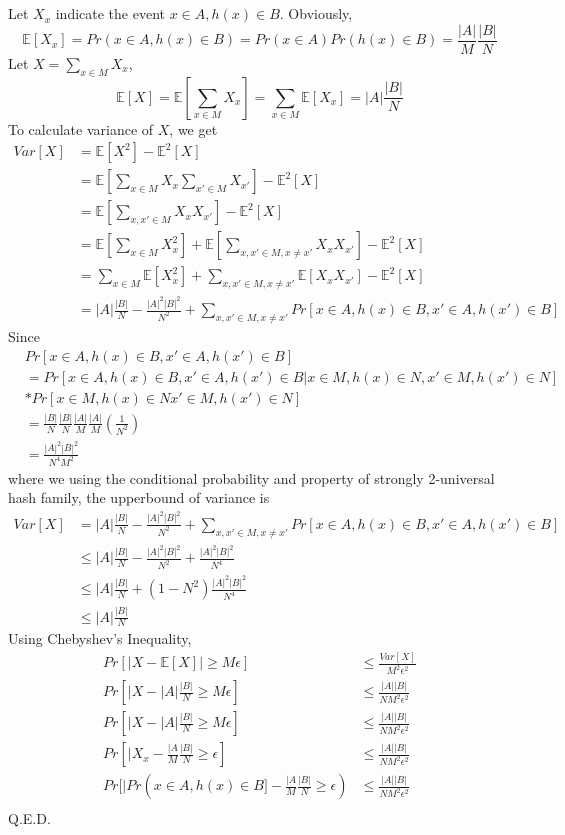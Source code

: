 \documentclass{article}
\begin{document}
	\section{}
	Let $X_x$ indicate the event ${x \in A, h(x) \in B}$.
	Obviously,
	$$
	\mathbb{E}[X_x]=Pr(x \in A, h(x) \in B) = Pr(x \in A)Pr(h(x) \in B) = \frac{|A|}{M}\frac{|B|}{N}
	$$
	Let $X=\sum_{x\in M}X_x$,
	$$
	\mathbb{E}[X]=\mathbb{E}[\sum_{x \in M}X_x]=\sum_{x \in M}\mathbb{E}[X_x]=|A|\frac{|B|}{N}
	$$
	To calculate variance of $X$, we get
	$$
	\begin{aligned}
	Var[X]&=\mathbb{E}[X^2]-\mathbb{E}^2[X]\\
		&=\mathbb{E}[\sum_{x \in M}X_x\sum_{x' \in M}X_{x'}]-\mathbb{E}^2[X]\\	
		&=\mathbb{E}[\sum_{x,x' \in M}X_xX_{x'}]-\mathbb{E}^2[X]\\
		&=\mathbb{E}[\sum_{x \in M}X_x^2]+\mathbb{E}[\sum_{x,x' \in M,x \neq x'}X_xX_{x'}]-\mathbb{E}^2[X]\\
		&=\sum_{x \in M}\mathbb{E}[X_x^2]+\sum_{x,x' \in M,x \neq x'}\mathbb{E}[X_xX_{x'}]-\mathbb{E}^2[X]\\
		&=|A|\frac{|B|}{N}-\frac{|A|^2|B|^2}{N^2}+\sum_{x,x' \in M,x \neq x'}Pr[x \in A, h(x) \in B, x' \in A, h(x') \in B]
	\end{aligned}
	$$
	Since
	$$
	\begin{aligned}
	&Pr[x \in A, h(x) \in B, x' \in A, h(x') \in B]\\
	&=Pr[x \in A, h(x) \in B, x' \in A, h(x') \in B|x \in M, h(x) \in N, x' \in M, h(x') \in N]\\
	&*Pr[x \in M, h(x) \in N x' \in M, h(x') \in N]\\
	&=\frac{|B|}{N}\frac{|B|}{N}\frac{|A|}{M}\frac{|A|}{M}(\frac{1}{N^2})\\
	&=\frac{|A|^2|B|^2}{N^4M^2}
	\end{aligned}
	$$
	where we using the conditional probability and property of strongly 2-universal hash family, the upperbound of variance is
	$$
	\begin{aligned}
	Var[X] &= |A|\frac{|B|}{N}-\frac{|A|^2|B|^2}{N^2}+\sum_{x,x' \in M,x \neq x'}Pr[x \in A, h(x) \in B, x' \in A, h(x') \in B]\\
	&\leq |A|\frac{|B|}{N}-\frac{|A|^2|B|^2}{N^2}+\frac{|A|^2|B|^2}{N^4}\\
	&\leq |A|\frac{|B|}{N}+(1-N^2)\frac{|A|^2|B|^2}{N^4}\\
	&\leq |A|\frac{|B|}{N}
	\end{aligned}
	$$
	Using Chebyshev's Inequality,
	$$
	\begin{aligned}
	Pr[|X-\mathbb{E}[X]| \geq M\epsilon] &\leq \frac{Var[X]}{M^2\epsilon^2}\\
	Pr[|X-|A|\frac{|B|}{N} \geq M\epsilon] &\leq \frac{|A||B|}{NM^2\epsilon^2}\\
	Pr[|X-|A|\frac{|B|}{N} \geq M\epsilon] &\leq \frac{|A||B|}{NM^2\epsilon^2}\\
	Pr[|X_x-\frac{|A}{M}\frac{|B|}{N} \geq \epsilon] &\leq \frac{|A||B|}{NM^2\epsilon^2}\\
	Pr[|Pr(x \in A, h(x) \in B]-\frac{|A}{M}\frac{|B|}{N} \geq \epsilon) &\leq \frac{|A||B|}{NM^2\epsilon^2}\\
	\end{aligned}
	$$
	Q.E.D.
\end{document}
